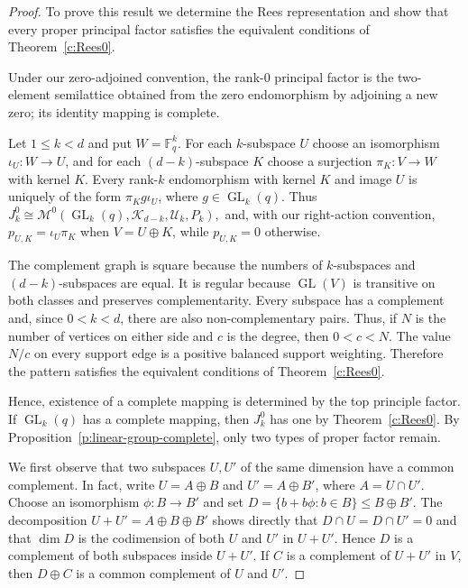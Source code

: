 \documentclass[11pt]{article}
\theoremstyle{plain}
\theoremstyle{remark}
\theoremstyle{definition}
\theoremstyle{plain}
\begin{document}
\begin{proof}
To prove this result we determine the Rees representation and show that every proper principal
factor satisfies the equivalent conditions of Theorem~\ref{c:Rees0}.

Under our zero-adjoined convention,
the rank-$0$ principal factor is the two-element semilattice obtained from the
zero endomorphism by adjoining a new zero; its identity mapping is complete. 

Let $1\le k<d$ and put
$W=\mathbb F_q^k$. For each $k$-subspace $U$ choose an isomorphism
$\iota_U\colon W\to U$, and for each $(d-k)$-subspace $K$ choose a
surjection $\pi_K\colon V\to W$ with kernel $K$. Every rank-$k$
endomorphism with kernel $K$ and image $U$ is uniquely of the form
$\pi_Kg\iota_U$, where $g\in\operatorname{GL}_k(q)$. Thus
\(J_k^0\cong \mathcal M^0(\operatorname{GL}_k(q),\mathcal K_{d-k},\mathcal U_k,P_k),\)
and, with our right-action convention, $p_{U,K}=\iota_U\pi_K$ when
$V=U\oplus K$, while $p_{U,K}=0$ otherwise.

The complement graph is square because the numbers of $k$-subspaces and
$(d-k)$-subspaces are equal. It is regular because $\operatorname{GL}(V)$
is transitive on both classes and preserves complementarity. Every subspace
has a complement and, since $0<k<d$, there are also non-complementary pairs.
Thus, if $N$ is the number of vertices on either side and $c$ is the degree,
then $0<c<N$. The value $N/c$ on every support edge is a positive balanced
support weighting. Therefore the pattern satisfies the equivalent conditions
of Theorem~\ref{c:Rees0}.

Hence, existence of a complete mapping is determined by the top principle factor.
If $\operatorname{GL}_k(q)$ has a complete mapping, then
$J_k^0$ has one by Theorem~\ref{c:Rees0}. By  Proposition~\ref{p:linear-group-complete}, only
two types of proper factor remain.

We first observe that two subspaces $U,U'$ of the same dimension have a common
complement. In fact, write $U=A\oplus B$ and $U'=A\oplus B'$, where
$A=U\cap U'$.
{Choose an isomorphism
$\phi\colon B\to B'$ and set
$D=\{b+b\phi:b\in B\}\le B\oplus B'$. The decomposition
$U+U'=A\oplus B\oplus B'$ shows directly that $D\cap U=D\cap U'=0$ and that
$\dim D$ is the codimension of both $U$ and $U'$ in $U+U'$. Hence $D$ is a
complement of both subspaces inside $U+U'$. If $C$ is a complement of $U+U'$
in $V$, then $D\oplus C$ is a common complement of $U$ and $U'$.} 


\end{proof}
\end{document}
